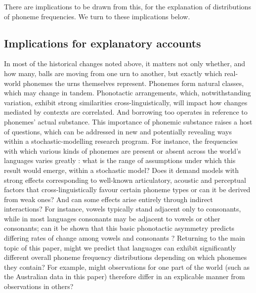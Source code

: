 There are implications to be drawn from this, for the explanation of distributions of phoneme frequencies. We turn to these implications below.

\hypertarget{implications-for-explanatory-accounts}{%
\subsection{Implications for explanatory accounts}\label{implications-for-explanatory-accounts}}

In most of the historical changes noted above, it matters not only whether, and how many, balls are moving from one urn to another, but exactly which real-world phonemes the urns themselves represent. Phonemes form natural classes, which may change in tandem. Phonotactic arrangements, which, notwithstanding variation, exhibit strong similarities cross-linguistically, will impact how changes mediated by contexts are correlated. And borrowing too operates in reference to phonemes' actual substance. This importance of phonemic substance raises a host of questions, which can be addressed in new and potentially revealing ways within a stochastic-modelling research program. For instance, the frequencies with which various kinds of phonemes are present or absent across the world's languages varies greatly \autocites{maddieson_patterns_1984}{moran_phonetics_2012}{everett_similar_2018}: what is the range of assumptions under which this result would emerge, within a stochastic model? Does it demand models with strong effects corresponding to well-known articulatory, acoustic and perceptual factors that cross-linguistically favour certain phoneme types \autocites{liljencrants_numerical_1972}{stevens_quantal_1989}{johnson_individual_1993}{browman_towards_1986}{proctor_gestural_2009}{becker-kristal_acoustic_2010}{everett_global_2018} or can it be derived from weak ones? And can some effects arise entirely through indirect interactions? For instance, vowels typically stand adjacent only to consonants, while in most languages consonants may be adjacent to vowels or other consonants; can it be shown that this basic phonotactic asymmetry predicts differing rates of change among vowels and consonants \autocite{evolang12}? Returning to the main topic of this paper, might we predict that languages can exhibit significantly different overall phoneme frequency distributions depending on which phonemes they contain? For example, might observations for one part of the world (such as the Australian data in this paper) therefore differ in an explicable manner from observations in others?


